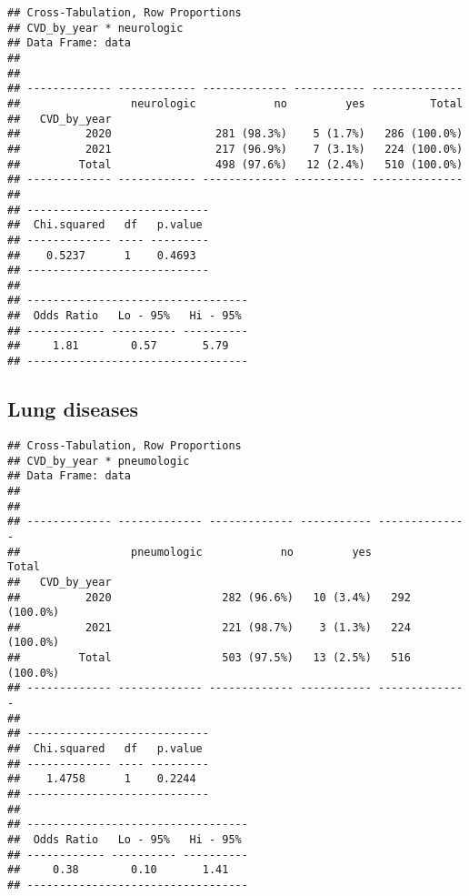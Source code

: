 \documentclass[
]{article}
\newenvironment{Shaded}{\begin{snugshade}}{\end{snugshade}}
\newcommand{\AttributeTok}[1]{\textcolor[rgb]{0.13,0.29,0.53}{#1}}
\newcommand{\ConstantTok}[1]{\textcolor[rgb]{0.56,0.35,0.01}{#1}}
\newcommand{\FunctionTok}[1]{\textcolor[rgb]{0.13,0.29,0.53}{\textbf{#1}}}
\newcommand{\NormalTok}[1]{#1}
\newcommand{\SpecialCharTok}[1]{\textcolor[rgb]{0.81,0.36,0.00}{\textbf{#1}}}
\newcommand{\StringTok}[1]{\textcolor[rgb]{0.31,0.60,0.02}{#1}}
\begin{document}
\begin{verbatim}
## Cross-Tabulation, Row Proportions  
## CVD_by_year * neurologic  
## Data Frame: data  
## 
## 
## ------------- ------------ ------------- ----------- --------------
##                 neurologic            no         yes          Total
##   CVD_by_year                                                      
##          2020                281 (98.3%)    5 (1.7%)   286 (100.0%)
##          2021                217 (96.9%)    7 (3.1%)   224 (100.0%)
##         Total                498 (97.6%)   12 (2.4%)   510 (100.0%)
## ------------- ------------ ------------- ----------- --------------
## 
## ----------------------------
##  Chi.squared   df   p.value 
## ------------- ---- ---------
##    0.5237      1    0.4693  
## ----------------------------
## 
## ----------------------------------
##  Odds Ratio   Lo - 95%   Hi - 95% 
## ------------ ---------- ----------
##     1.81        0.57       5.79   
## ----------------------------------
\end{verbatim}

\hypertarget{lung-diseases}{%
\subsection{Lung diseases}\label{lung-diseases}}

\begin{Shaded}
\end{Shaded}

\begin{verbatim}
## Cross-Tabulation, Row Proportions  
## CVD_by_year * pneumologic  
## Data Frame: data  
## 
## 
## ------------- ------------- ------------- ----------- --------------
##                 pneumologic            no         yes          Total
##   CVD_by_year                                                       
##          2020                 282 (96.6%)   10 (3.4%)   292 (100.0%)
##          2021                 221 (98.7%)    3 (1.3%)   224 (100.0%)
##         Total                 503 (97.5%)   13 (2.5%)   516 (100.0%)
## ------------- ------------- ------------- ----------- --------------
## 
## ----------------------------
##  Chi.squared   df   p.value 
## ------------- ---- ---------
##    1.4758      1    0.2244  
## ----------------------------
## 
## ----------------------------------
##  Odds Ratio   Lo - 95%   Hi - 95% 
## ------------ ---------- ----------
##     0.38        0.10       1.41   
## ----------------------------------
\end{verbatim}
\end{document}
